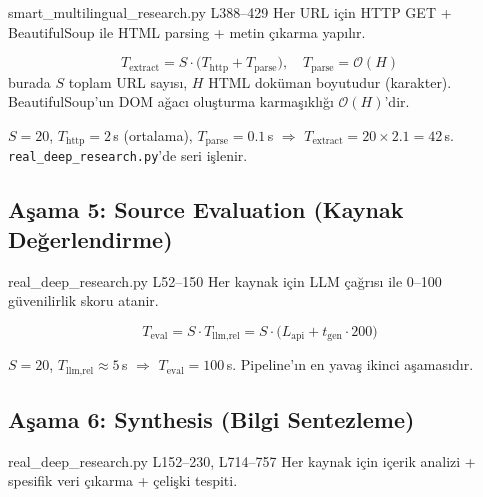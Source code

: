 \begin{kodref}{smart\_multilingual\_research.py L388--429}
Her URL i\c{c}in HTTP GET + BeautifulSoup ile HTML parsing + metin \c{c}{\i}karma yap{\i}l{\i}r.
\end{kodref}

\begin{equation}
\label{eq:extract_time}
T_{\text{extract}} = S \cdot \bigl(T_{\text{http}} + T_{\text{parse}}\bigr), \quad T_{\text{parse}} = \mathcal{O}(H)
\end{equation}
burada $S$ toplam URL say{\i}s{\i}, $H$ HTML dok\"{u}man boyutudur (karakter). BeautifulSoup'un DOM a\u{g}ac{\i} olu\c{s}turma karma\c{s}{\i}kl{\i}\u{g}{\i} $\mathcal{O}(H)$'dir.

\begin{ornek}
$S = 20$, $T_{\text{http}} = 2$\,s (ortalama), $T_{\text{parse}} = 0.1$\,s $\Rightarrow$ $T_{\text{extract}} = 20 \times 2.1 = 42$\,s. \texttt{real\_deep\_research.py}'de seri i\c{s}lenir.
\end{ornek}

\subsection{A\c{s}ama 5: Source Evaluation (Kaynak De\u{g}erlendirme)}

\begin{kodref}{real\_deep\_research.py L52--150}
Her kaynak i\c{c}in LLM \c{c}a\u{g}r{\i}s{\i} ile 0--100 g\"{u}venilirlik skoru atanir.
\end{kodref}

\begin{equation}
\label{eq:eval_time}
T_{\text{eval}} = S \cdot T_{\text{llm,rel}} = S \cdot \bigl(L_{\text{api}} + t_{\text{gen}} \cdot 200\bigr)
\end{equation}

\begin{ornek}
$S = 20$, $T_{\text{llm,rel}} \approx 5$\,s $\Rightarrow$ $T_{\text{eval}} = 100$\,s. Pipeline'{\i}n en yava\c{s} ikinci a\c{s}amas{\i}d{\i}r.
\end{ornek}

\subsection{A\c{s}ama 6: Synthesis (Bilgi Sentezleme)}

\begin{kodref}{real\_deep\_research.py L152--230, L714--757}
Her kaynak i\c{c}in i\c{c}erik analizi + spesifik veri \c{c}{\i}karma + \c{c}eli\c{s}ki tespiti.
\end{kodref}

